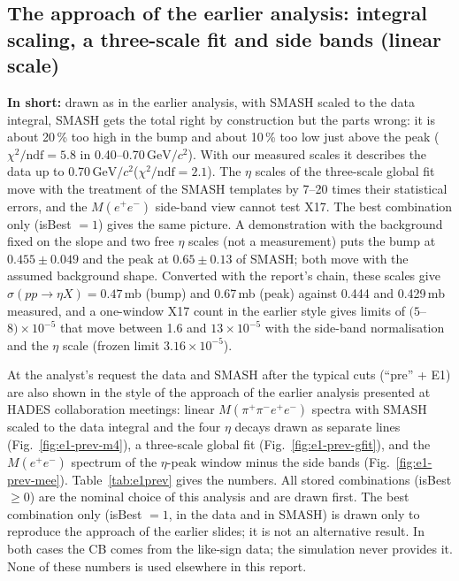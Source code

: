 \documentclass[11pt,a4paper]{article}
\newcommand{\Mfour}{\ensuremath{M(\pi^{+}\pi^{-}e^{+}e^{-})}\xspace}
\newcommand{\Mee}{\ensuremath{M(e^{+}e^{-})}\xspace}
\newcommand{\GeVcc}{\ensuremath{\mathrm{GeV}/c^{2}}\xspace}
\newcommand{\sigeta}{\ensuremath{\sigma(pp\to\eta X)}\xspace}
\newcommand{\tipbox}[1]{\par\noindent\colorbox{blue!6}{\parbox{\dimexpr\linewidth-2\fboxsep\relax}{#1}}\par}
\newcommand{\inshort}[1]{\tipbox{\textbf{In short:} #1}}%
\newcommand{\cs}[1]{\textsf{#1}}%
\begin{document}
\subsection{The approach of the earlier analysis: integral scaling, a three-scale fit and side bands (linear scale)}
\label{sec:e1prev}
\inshort{drawn as in the earlier analysis, with SMASH scaled to the data integral, SMASH gets the total right by construction but the parts
wrong: it is about 20\,\% too high in the bump and about 10\,\% too low just above the peak ($\chi^2/\mathrm{ndf}=5.8$ in 0.40--0.70\,\GeVcc).
With our measured scales it describes the data up to 0.70\,\GeVcc ($\chi^2/\mathrm{ndf}=2.1$). The $\eta$ scales of the three-scale global fit
move with the treatment of the SMASH templates by 7--20 times their statistical errors, and the \Mee side-band view cannot test X17. The best
combination only (isBest $=1$) gives the same picture. A demonstration with the background fixed on the slope and two free $\eta$ scales (not
a measurement) puts the bump at $0.455\pm0.049$ and the peak at $0.65\pm0.13$ of SMASH; both move with the assumed background shape.
Converted with the report's chain, these scales give \sigeta$=0.47$\,mb (bump) and 0.67\,mb (peak) against 0.444 and 0.429\,mb measured,
and a one-window X17 count in the earlier style gives limits of $(5$--$8)\times10^{-5}$ that move between 1.6 and $13\times10^{-5}$ with the
side-band normalisation and the $\eta$ scale (frozen limit $3.16\times10^{-5}$).}

At the analyst's request the data and SMASH after the typical cuts (``pre'' + \cs{E1}) are also shown in the style of the approach of the earlier
analysis presented at HADES collaboration meetings: linear \Mfour spectra with SMASH scaled to the data integral and the four $\eta$ decays drawn
as separate lines (Fig.~\ref{fig:e1-prev-m4}), a three-scale global fit (Fig.~\ref{fig:e1-prev-gfit}), and the \Mee spectrum of the $\eta$-peak
window minus the side bands (Fig.~\ref{fig:e1-prev-mee}). Table~\ref{tab:e1prev} gives the numbers. All stored combinations (isBest $\ge0$) are
the nominal choice of this analysis and are drawn first. The best combination only (isBest $=1$, in the data and in SMASH) is drawn only to
reproduce the approach of the earlier slides; it is not an alternative result. In both cases the CB comes from the like-sign data; the simulation
never provides it. None of these numbers is used elsewhere in this report.
\end{document}
